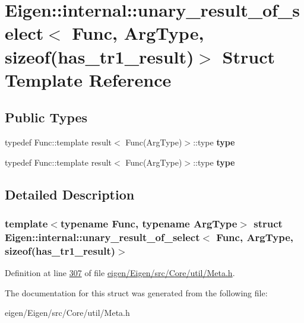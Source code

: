\hypertarget{struct_eigen_1_1internal_1_1unary__result__of__select_3_01_func_00_01_arg_type_00_01sizeof_07has__tr1__result_08_4}{}\section{Eigen\+:\+:internal\+:\+:unary\+\_\+result\+\_\+of\+\_\+select$<$ Func, Arg\+Type, sizeof(has\+\_\+tr1\+\_\+result)$>$ Struct Template Reference}
\label{struct_eigen_1_1internal_1_1unary__result__of__select_3_01_func_00_01_arg_type_00_01sizeof_07has__tr1__result_08_4}
\subsection*{Public Types}
\begin{DoxyCompactItemize}
\item 
\mbox{\label{struct_eigen_1_1internal_1_1unary__result__of__select_3_01_func_00_01_arg_type_00_01sizeof_07has__tr1__result_08_4_a4c6d5d3db086d2eefd6b334debc16216}} 
typedef Func\+::template result$<$ Func(Arg\+Type)$>$\+::type {\bfseries type}
\item 
\mbox{\label{struct_eigen_1_1internal_1_1unary__result__of__select_3_01_func_00_01_arg_type_00_01sizeof_07has__tr1__result_08_4_a4c6d5d3db086d2eefd6b334debc16216}} 
typedef Func\+::template result$<$ Func(Arg\+Type)$>$\+::type {\bfseries type}
\end{DoxyCompactItemize}


\subsection{Detailed Description}
\subsubsection*{template$<$typename Func, typename Arg\+Type$>$\newline
struct Eigen\+::internal\+::unary\+\_\+result\+\_\+of\+\_\+select$<$ Func, Arg\+Type, sizeof(has\+\_\+tr1\+\_\+result)$>$}



Definition at line \hyperlink{eigen_2_eigen_2src_2_core_2util_2_meta_8h_source_l00307}{307} of file \hyperlink{eigen_2_eigen_2src_2_core_2util_2_meta_8h_source}{eigen/\+Eigen/src/\+Core/util/\+Meta.\+h}.



The documentation for this struct was generated from the following file\+:\begin{DoxyCompactItemize}
\item 
eigen/\+Eigen/src/\+Core/util/\+Meta.\+h\end{DoxyCompactItemize}
